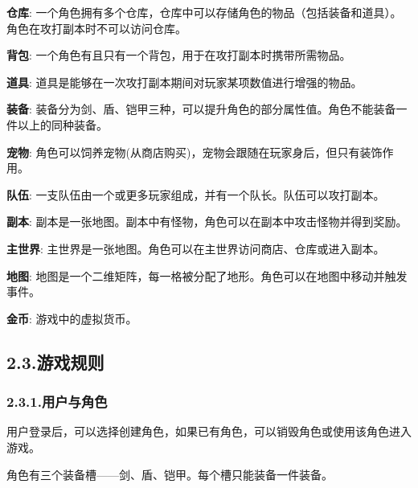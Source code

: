 \documentclass{article}
\begin{document}
\textbf{仓库}: 一个角色拥有多个仓库，仓库中可以存储角色的物品（包括装备和道具）。 角色在攻打副本时不可以访问仓库。%

\textbf{背包}: 一个角色有且只有一个背包，用于在攻打副本时携带所需物品。%

\textbf{道具}: 道具是能够在一次攻打副本期间对玩家某项数值进行增强的物品。%

\textbf{装备}: 装备分为剑、盾、铠甲三种，可以提升角色的部分属性值。角色不能装备一件以上的同种装备。%

\textbf{宠物}: 角色可以饲养宠物(从商店购买)，宠物会跟随在玩家身后，但只有装饰作用。%

\textbf{队伍}: 一支队伍由一个或更多玩家组成，并有一个队长。队伍可以攻打副本。%

\textbf{副本}: 副本是一张地图。副本中有怪物，角色可以在副本中攻击怪物并得到奖励。%

\textbf{主世界}: 主世界是一张地图。角色可以在主世界访问商店、仓库或进入副本。%

\textbf{地图}: 地图是一个二维矩阵，每一格被分配了地形。角色可以在地图中移动并触发事件。%

\textbf{金币}: 游戏中的虚拟货币。%

\subsection{2.3.\hspace*{0.5em}游戏规则}\label{23}%

\subsubsection{2.3.1.\hspace*{0.5em}用户与角色}\label{231}%

\noindent{}用户登录后，可以选择创建角色，如果已有角色，可以销毁角色或使用该角色进入游戏。%

角色有三个装备槽——剑、盾、铠甲。每个槽只能装备一件装备。%
\end{document}
